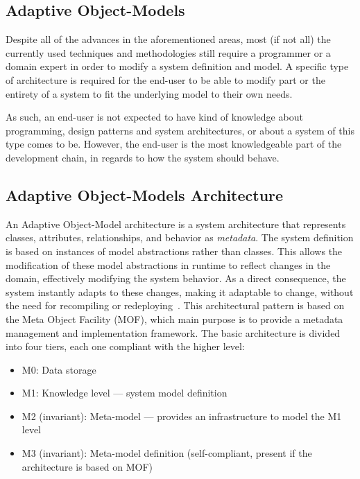 \subsection{Adaptive Object-Models}\label{sec:aom}

Despite all of the advances in the aforementioned areas, most (if not all) the currently used techniques and methodologies still require a programmer or a domain expert in order to modify a system definition and model. A specific type of architecture is required for the end-user to be able to modify part or the entirety of a system to fit the underlying model to their own needs.

As such, an end-user is not expected to have kind of knowledge about programming, design patterns and system architectures, or about a system of this type comes to be. However, the end-user is the most knowledgeable part of the development chain, in regards to how the system should behave.

\subsection{Adaptive Object-Models Architecture}\label{sec:aom_architecture}

An Adaptive Object-Model architecture is a system architecture that represents classes, attributes, relationships, and behavior as \emph{metadata}. The system definition is based on instances of model abstractions rather than classes. This allows the modification of these model abstractions in runtime to reflect changes in the domain, effectively modifying the system behavior. As a direct consequence, the system instantly adapts to these changes, making it adaptable to change, without the need for recompiling or redeploying~\cite{YBJ01}. This architectural pattern is based on the Meta Object Facility (MOF), which main purpose is to provide a metadata management and implementation framework. The basic architecture is divided into four tiers, each one compliant with the higher level:~\cite{mof}

\begin{itemize}
  \item M0: Data storage
  \item M1: Knowledge level --- system model definition
  \item M2 (invariant): Meta-model --- provides an infrastructure to model the M1 level
  \item M3 (invariant): Meta-model definition (self-compliant, present if the architecture is based on MOF)
\end{itemize}

